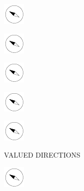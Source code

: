 \documentclass[11pt,titlepage]{article}
\begin{document}
\vspace{12mm}

\noindent
\hspace{1mm}\includegraphics[]{compass.pdf}

\vspace{12mm}

\noindent
\hspace{1mm}\includegraphics[]{compass.pdf}

\vspace{12mm}

\noindent
\hspace{1mm}\includegraphics[]{compass.pdf}

\vspace{12mm}

\noindent
\hspace{1mm}\includegraphics[]{compass.pdf}

\vspace{12mm}

\noindent
\hspace{1mm}\includegraphics[]{compass.pdf}

\pagebreak

\small
\hfill VALUED DIRECTIONS

\vspace{6mm}

\noindent
\hspace{1mm}\includegraphics[]{compass.pdf}

\vspace{12mm}
\end{document}
